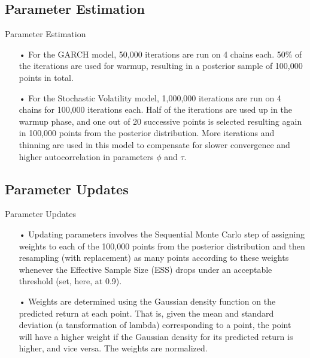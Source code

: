 \documentclass[11pt]{beamer}
\begin{document}
\subsection{Parameter Estimation}
\begin{frame}{Parameter Estimation}
\begin{enumerate}
\item[•]For the GARCH model, 50,000 iterations are run on 4 chains each. 50\% of the iterations are used for warmup, resulting in a posterior sample of 100,000 points in total.  

\item[•] For the Stochastic Volatility model, 1,000,000 iterations are run on 4 chains for 100,000 iterations each. Half of the iterations are used up in the warmup phase, and one out of 20 successive points is selected resulting again in 100,000 points from the posterior distribution. More iterations and thinning are used in this model to compensate for slower convergence and higher autocorrelation in parameters $\phi$ and $\tau$. 
\end{enumerate}


\end{frame}

\subsection{Parameter Updates}
\begin{frame}{Parameter Updates}
\begin{enumerate}
\item[•] Updating parameters involves the Sequential Monte Carlo step of assigning weights to each of the 100,000 points from the posterior distribution and then resampling (with replacement) as many points according to these weights whenever the Effective Sample Size (ESS) drops under an acceptable threshold (set, here, at 0.9).

\item[•] Weights are determined using the Gaussian density function on the predicted return at each point. That is, given the mean and standard deviation (a tansformation of lambda) corresponding to a point, the point will have a higher weight if the Gaussian density for its predicted return is higher, and vice versa. The weights are normalized.
\end{enumerate}
\end{frame}
\end{document}
